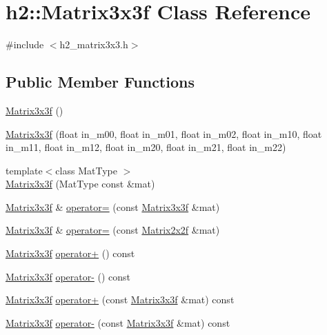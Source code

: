 \hypertarget{classh2_1_1_matrix3x3f}{\section{h2\-:\-:Matrix3x3f Class Reference}
\label{classh2_1_1_matrix3x3f}
}


{\ttfamily \#include $<$h2\-\_\-matrix3x3.\-h$>$}

\subsection*{Public Member Functions}
\begin{DoxyCompactItemize}
\item 
\hyperlink{classh2_1_1_matrix3x3f_ae6eec4501f7c3fdee7b83fa081d62e57}{Matrix3x3f} ()
\item 
\hyperlink{classh2_1_1_matrix3x3f_a7fb7a3271a23d5ace396363798866e4c}{Matrix3x3f} (float in\-\_\-m00, float in\-\_\-m01, float in\-\_\-m02, float in\-\_\-m10, float in\-\_\-m11, float in\-\_\-m12, float in\-\_\-m20, float in\-\_\-m21, float in\-\_\-m22)
\item 
{\footnotesize template$<$class Mat\-Type $>$ }\\\hyperlink{classh2_1_1_matrix3x3f_aa1780dd8a877958c72785b596c7d30d6}{Matrix3x3f} (Mat\-Type const \&mat)
\item 
\hyperlink{classh2_1_1_matrix3x3f}{Matrix3x3f} \& \hyperlink{classh2_1_1_matrix3x3f_ab5012c7cde732bff74e2ba87139ce666}{operator=} (const \hyperlink{classh2_1_1_matrix3x3f}{Matrix3x3f} \&mat)
\item 
\hyperlink{classh2_1_1_matrix3x3f}{Matrix3x3f} \& \hyperlink{classh2_1_1_matrix3x3f_afaeb4aae5a0db43ba721e8eca3ac44fc}{operator=} (const \hyperlink{classh2_1_1_matrix2x2f}{Matrix2x2f} \&mat)
\item 
\hyperlink{classh2_1_1_matrix3x3f}{Matrix3x3f} \hyperlink{classh2_1_1_matrix3x3f_a1e1d521376ec2334e38cde548ed47347}{operator+} () const 
\item 
\hyperlink{classh2_1_1_matrix3x3f}{Matrix3x3f} \hyperlink{classh2_1_1_matrix3x3f_ad72fdcff57bb5779e9010b7d70726fd1}{operator-\/} () const 
\item 
\hyperlink{classh2_1_1_matrix3x3f}{Matrix3x3f} \hyperlink{classh2_1_1_matrix3x3f_ac500797a9a4948393ba46ecfedb9e17f}{operator+} (const \hyperlink{classh2_1_1_matrix3x3f}{Matrix3x3f} \&mat) const 
\item 
\hyperlink{classh2_1_1_matrix3x3f}{Matrix3x3f} \hyperlink{classh2_1_1_matrix3x3f_a076d5377bddf8a6578a8697e61d2fae3}{operator-\/} (const \hyperlink{classh2_1_1_matrix3x3f}{Matrix3x3f} \&mat) const 

\end{DoxyCompactItemize}
